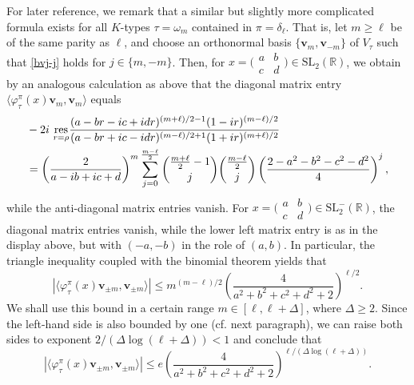 \documentclass[11pt,oneside]{amsart}
\numberwithin{equation}{section}
\theoremstyle{remark}
\theoremstyle{plain}
\newcommand\SL{\mathrm{SL}}
\newcommand\RR{\mathbb{R}}
\newcommand{\bv}{\mathbf{v}}
\renewcommand\leq{\leqslant}
\renewcommand\geq{\geqslant}
\begin{document}
For later reference, we remark that a similar but slightly more complicated formula exists for all $K$-types $\tau=\omega_m$ contained in $\pi=\delta_\ell$. That is, let $m\geq\ell$ be of the same parity as $\ell$, and choose an orthonormal basis $\{\bv_m,\bv_{-m}\}$ of $V_\tau$ such that \eqref{bvj-j} holds for $j\in\{m,-m\}$. Then, for $x=\bigl(\begin{smallmatrix} a & b \\ c & d \end{smallmatrix}\bigr)\in\SL_2(\RR)$, we obtain by an analogous calculation as above that the diagonal matrix entry
$\langle\varphi_\tau^\pi(x)\bv_m,\bv_m\rangle$ equals
\begin{align}
\notag&-2i\ \underset{r=\rho}{\mathrm{res}}\frac{(a-br-ic+idr)^{(m+\ell)/2-1}(1-ir)^{(m-\ell)/2}}{(a-br+ic-idr)^{(m-\ell)/2+1}(1+ir)^{(m+\ell)/2}}\\
\label{eq:genmatrixcoeff}&=\left(\frac{2}{a-ib+ic+d}\right)^m
\sum_{j=0}^{\frac{m-\ell}{2}}
\binom{\frac{m+\ell}{2}-1}{j}\binom{\frac{m-\ell}{2}}{j}
\left(\frac{2-a^2-b^2-c^2-d^2}{4}\right)^j,
\end{align}
while the anti-diagonal matrix entries vanish. For $x=\bigl(\begin{smallmatrix} a & b \\ c & d \end{smallmatrix}\bigr)\in\SL_2^-(\RR)$, the diagonal matrix entries vanish, while the lower left matrix entry is as in the display above, but with $(-a,-b)$ in the role of $(a,b)$. In particular, the triangle inequality coupled with the binomial theorem yields that
\[|\langle\varphi_\tau^\pi(x)\bv_{\pm m},\bv_{\pm m}\rangle|
\leq m^{(m-\ell)/2}\left(\frac{4}{a^2+b^2+c^2+d^2+2}\right)^{\ell/2}.\]
We shall use this bound in a certain range $m\in[\ell,\ell+\Delta]$, where $\Delta\geq 2$. Since the left-hand side is also bounded by one (cf. next paragraph), we can raise both sides to exponent $2/(\Delta\log(\ell+\Delta))<1$ and conclude that
\begin{equation}\label{eq:goodbound}
|\langle\varphi_\tau^\pi(x)\bv_{\pm m},\bv_{\pm m}\rangle|
\leq e\left(\frac{4}{a^2+b^2+c^2+d^2+2}\right)^{\ell/(\Delta\log(\ell+\Delta))}.
\end{equation}
\end{document}
